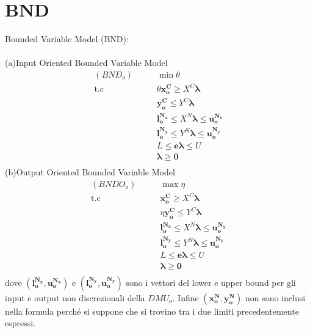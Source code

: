 \section{BND}
\begin{definiz} Bounded Variable Model (BND):\\\\
(a)Input Oriented Bounded Variable Model
\begin{equation}
\begin{split}
(BND_o) \qquad & \min \theta \\
\text{t.c} \qquad &  \theta \boldsymbol{x_{o}^C} \geq X^C\boldsymbol{\lambda} \\
&  \boldsymbol{y_{o}^C} \leq Y^C\boldsymbol{\lambda} \\
&  \boldsymbol{l_{o}^{N_{x}}} \leq X^N \boldsymbol{\lambda} \leq \boldsymbol{u_{o}^{N_{x}}} \\
&  \boldsymbol{l_{o}^{N_{y}}} \leq Y^N \boldsymbol{\lambda} \leq \boldsymbol{u_{o}^{N_{y}}} \\
&  L \leq \boldsymbol{e \lambda} \leq U \\
&  \boldsymbol{\lambda \geq 0}   \\
\end{split}
\end{equation}
(b)Output Oriented Bounded Variable Model
\begin{equation}
\begin{split}
(BNDO_o) \qquad & \max \eta \\
\text{t.c} \qquad &  \boldsymbol{x_{o}^C} \geq X^C\boldsymbol{\lambda} \\
&  \eta \boldsymbol{y_{o}^C} \leq Y^C\boldsymbol{\lambda} \\
&  \boldsymbol{l_{o}^{N_{x}}} \leq X^N \boldsymbol{\lambda} \leq \boldsymbol{u_{o}^{N_{x}}} \\
&  \boldsymbol{l_{o}^{N_{y}}} \leq Y^N \boldsymbol{\lambda} \leq \boldsymbol{u_{o}^{N_{y}}} \\
&  L \leq \boldsymbol{e \lambda} \leq U \\
&  \boldsymbol{\lambda \geq 0}   \\
\end{split}
\end{equation}
dove $(\boldsymbol{l_{o}^{N_{x}}, u_{o}^{N_{x}}})$ e $(\boldsymbol{l_{o}^{N_{y}}, u_{o}^{N_{y}}})$ sono i vettori del lower e upper bound per gli input e output non discrezionali della $DMU_o$. Infine $(\boldsymbol{x_o^N, y_o^N})$ non sono inclusi nella formula perch\'e si suppone che si trovino tra i due limiti precedentemente espressi.
\end{definiz}